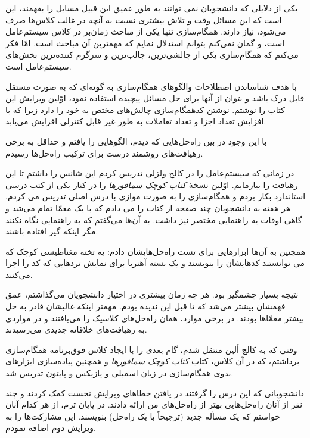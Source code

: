 \documentclass{book}
\begin{document}
یکی از دلایلی که دانشجویان نمی توانند به طور عمیق این قبیل مسایل را بفهمند، این است که این مسائل وقت و تلاش بیشتری نسبت به 
آنچه در غالب کلاس‌ها صرف می‌شود، نیاز دارند. 
همگام‌سازی تنها یکی از مباحث زمان‌بر در کلاس سیستم‌عامل  است،
و گمان نمی‌کنم بتوانم استدلال نمایم که مهمترین آن مباحث است. 
امّا فکر می‌کنم که همگام‌سازی یکی از چالشی‌ترین، جالب‌ترین و سرگرم‌ کننده‌ترین بخش‌های سیستم‌عامل است.

با هدف شناساندن  اصطلاحات والگوهای همگام‌سازی به گونه‌ای که به صورت مستقل قابل درک باشد و بتوان از آنها برای حل مسائل پیچیده استفاده نمود، 
اوّلین ویرایش این کتاب را نوشتم.
نوشتن کدهمگام‌سازی چالش‌های مختص به خود را دارد زیرا که با افزایش تعداد اجزا و تعداد تعاملات به طور غیر قابل کنترلی افزایش می‌‌یابد.

با این وجود در بین راه‌حل‌هایی که دیدم، الگوهایی را یافتم و حداقل به برخی رهیافت‌های روشمند درست برای ترکیب راه‌حل‌ها رسیدم.

در زمانی که سیستم‌عامل را در کالج ولزلی تدریس کردم این شانس را داشتم تا این رهیافت را بیازمایم. 
اوّلین نسخهٔ \emph{کتاب کوچک سمافورها} را در کنار یکی از کتب درسی استاندارد بکار بردم و همگام‌سازی را به صورت موازی با درس اصلی تدریس می کردم.
هر هفته به دانشجویان چند صفحه از کتاب را می دادم که با یک معمّا تمام می‌شد و گاهی اوقات یه راهنمایی مختصر نیز داشت. 
به آن‌ها می‌گفتم که به راهنمایی نگاه نکنند مگر اینکه گیر افتاده باشند.

همچنین به آن‌ها ابزارهایی برای تست راه‌حل‌هایشان دادم: 
یه تخته مغناطیسی کوچک که می توانستند کدهایشان را بنویسند و یک بسته آهنربا برای نمایش تردهایی که کد را اجرا می‌کنند.

نتیجه بسیار چشمگیر بود. 
هر چه زمان بیشتری در اختیار دانشجویان می‌گذاشتم، عمق فهمشان بیشتر می‌شد که تا قبل این ندیده بودم. 
    مهمتر اینکه غالبشان قادر به حل بیشتر معمّاها بودند.
    در برخی موارد،‌ همان راه‌حل‌های کلاسیک را می‌یافتند و در مواردی به رهیافت‌های خلاقانه جدیدی می‌رسیدند. 
    
وقتی که به کالج اُلین منتقل شدم،‌ 
گام بعدی را با ایجاد کلاس فوق‌برنامه همگام‌سازی برداشتم، که در آن کلاس، کتاب \emph{کتاب کوچک سمافورها}  
و همچنین پیاده‌سازی ابزارهای بدوی همگام‌سازی در زبان اسمبلی  و پازیکس و پایتون تدریس شد.

دانشجویانی که این درس را گرفتند در یافتن خطاهای ویرایش نخست کمک کردند و چند نفر از آنان راه‌حل‌هایی بهتر از راه‌حل‌های من ارائه دادند. 
در پایان ترم، از هر کدام آنان خواستم که یک مسأله جدید (ترجیحاً با یک راه‌حل) بنویسند. این مشارکت‌ها را به ویرایش دوم اضافه نمودم. 
\end{document}
